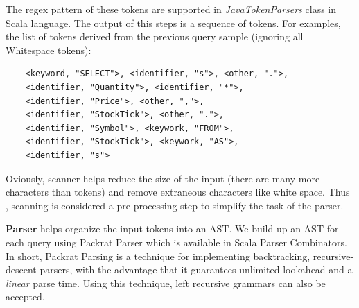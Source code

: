 The regex pattern of these tokens are supported in \textit{JavaTokenParsers} class in Scala language. The output of this steps is a sequence of tokens. For examples, the list of tokens derived from the previous query sample (ignoring all Whitespace tokens):
\begin{lstlisting}
	<keyword, "SELECT">, <identifier, "s">, <other, ".">,
	<identifier, "Quantity">, <identifier, "*">, 
	<identifier, "Price">, <other, ",">, 
	<identifier, "StockTick">, <other, ".">,
	<identifier, "Symbol">, <keywork, "FROM">,
	<identifier, "StockTick">, <keywork, "AS">, 
	<identifier, "s">   
\end{lstlisting}

Oviously, scanner helps reduce the size of the input (there are many more characters than tokens) and remove extraneous characters like white space. Thus  , scanning is considered a pre-processing step to simplify the task of the parser.

\textbf{Parser} helps organize the input tokens into an AST. We build up an AST for each query using Packrat Parser which is available in Scala Parser Combinators. 
In short, Packrat Parsing is a technique for implementing backtracking, recursive-descent parsers, with the advantage that it guarantees unlimited lookahead and a \textit{linear} parse time. Using this technique, left recursive grammars can also be accepted.

